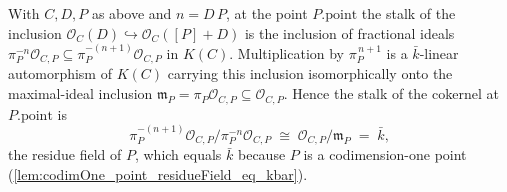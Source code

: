 \begin{lemma}
  \label{lem:cokernel_sheafOf_single_add_stalkAtP_iso_kbar}
  With \(C, D, P\) as above and \(n = D\,P\), at the point \(P.\mathrm{point}\)
  the stalk of the inclusion \(\mathcal O_C(D) \hookrightarrow \mathcal
  O_C([P]+D)\) is the inclusion of fractional ideals
  \(\pi_P^{-n}\mathcal O_{C,P} \subseteq \pi_P^{-(n+1)}\mathcal O_{C,P}\) in
  \(K(C)\). Multiplication by \(\pi_P^{\,n+1}\) is a \(\bar k\)-linear
  automorphism of \(K(C)\) carrying this inclusion isomorphically onto the
  maximal-ideal inclusion \(\mathfrak m_P = \pi_P\mathcal O_{C,P} \subseteq
  \mathcal O_{C,P}\). Hence the stalk of the cokernel at \(P.\mathrm{point}\) is
  \[
    \pi_P^{-(n+1)}\mathcal O_{C,P} \big/ \pi_P^{-n}\mathcal O_{C,P}
    \;\cong\; \mathcal O_{C,P}/\mathfrak m_P \;=\; \bar k,
  \]
  the residue field of \(P\), which equals \(\bar k\) because \(P\) is a
  codimension-one point (\cref{lem:codimOne_point_residueField_eq_kbar}).
\end{lemma}

